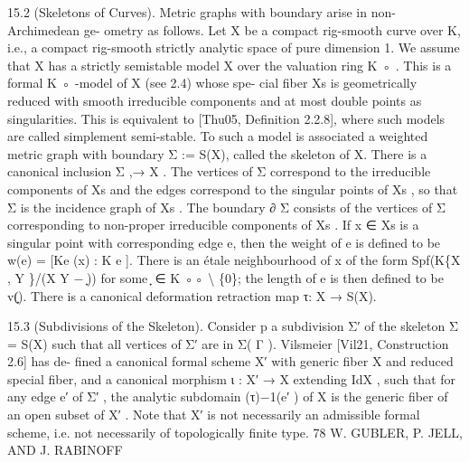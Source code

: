 \documentclass[
  10pt,
]{article}
\newenvironment{Shaded}{}{}
\newcommand{\NormalTok}[1]{#1}
\begin{document}
\begin{Shaded}
\begin{Highlighting}[]
\NormalTok{15.2 (Skeletons of Curves). Metric graphs with boundary arise in non{-}Archimedean ge{-}}
\NormalTok{ometry as follows. Let X be a compact rig{-}smooth curve over K, i.e., a compact rig{-}smooth}
\NormalTok{strictly analytic space of pure dimension 1. We assume that X has a strictly semistable}
\NormalTok{model X over the valuation ring K ◦ . This is a formal K ◦ {-}model of X (see 2.4) whose spe{-}}
\NormalTok{cial fiber Xs is geometrically reduced with smooth irreducible components and at most}
\NormalTok{double points as singularities. This is equivalent to [Thu05, Definition 2.2.8], where}
\NormalTok{such models are called simplement semi{-}stable. To such a model is associated a weighted}
\NormalTok{metric graph with boundary Σ := S(X), called the skeleton of X. There is a canonical}
\NormalTok{inclusion Σ ,→ X . The vertices of Σ correspond to the irreducible components of Xs and}
\NormalTok{the edges correspond to the singular points of Xs , so that Σ is the incidence graph of Xs .}
\NormalTok{The boundary ∂ Σ consists of the vertices of Σ corresponding to non{-}proper irreducible}
\NormalTok{components of Xs . If x ∈ Xs is a singular point with corresponding edge e, then the}
\NormalTok{weight of e is defined to be w(e) = [Ke (x) : K}
\NormalTok{                                              e ]. There is an étale neighbourhood of x of}
\NormalTok{the form Spf(K\{X , Y \}/(X Y − ̟)) for some ̟ ∈ K ◦◦ \textbackslash{} \{0\}; the length of e is then defined}
\NormalTok{to be v(̟). There is a canonical deformation retraction map τ: X → S(X).}

\NormalTok{15.3 (Subdivisions of the Skeleton). Consider}
\NormalTok{                                      p         a subdivision Σ′ of the skeleton Σ = S(X)}
\NormalTok{such that all vertices of Σ′ are in Σ( Γ ). Vilsmeier [Vil21, Construction 2.6] has de{-}}
\NormalTok{fined a canonical formal scheme X′ with generic fiber X and reduced special fiber, and a}
\NormalTok{canonical morphism ι : X′ → X extending IdX , such that for any edge e′ of Σ′ , the analytic}
\NormalTok{subdomain (τ)−1(e′ ) of X is the generic fiber of an open subset of X′ . Note that X′ is not}
\NormalTok{necessarily an admissible formal scheme, i.e. not necessarily of topologically finite type.}
\NormalTok{78                             W. GUBLER, P. JELL, AND J. RABINOFF}


\end{Highlighting}
\end{Shaded}
\end{document}
